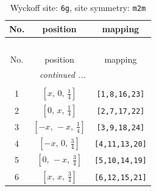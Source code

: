 \documentclass[fleqn,8pt]{jsarticle}
\begin{document}
\renewcommand{\arraystretch}{1.2}
\begin{longtable}{ccc}
\caption{Wyckoff site: {\tt 6g}, site symmetry: {\tt m2m}}
 \\
 \hline \hline
No. & position & mapping \\ \hline \endfirsthead

\multicolumn{2}{l}{\tablename\ \thetable{}} \\
 \hline \hline
No. & position & mapping \\ \hline \endhead

 \hline \hline
\multicolumn{2}{r}{\footnotesize\it continued ...} \\ \endfoot

 \hline \hline
\multicolumn{2}{r}{} \\ \endlastfoot

1 & $\left[ x,\, 0,\, \frac{1}{4} \right]$ & {\tt [1,8,16,23]} \\ \hline
2 & $\left[ 0,\, x,\, \frac{1}{4} \right]$ & {\tt [2,7,17,22]} \\ \hline
3 & $\left[ - x,\, - x,\, \frac{1}{4} \right]$ & {\tt [3,9,18,24]} \\ \hline
4 & $\left[ - x,\, 0,\, \frac{3}{4} \right]$ & {\tt [4,11,13,20]} \\ \hline
5 & $\left[ 0,\, - x,\, \frac{3}{4} \right]$ & {\tt [5,10,14,19]} \\ \hline
6 & $\left[ x,\, x,\, \frac{3}{4} \right]$ & {\tt [6,12,15,21]} \\
\end{longtable}
\renewcommand{\arraystretch}{1.2}
\end{document}
